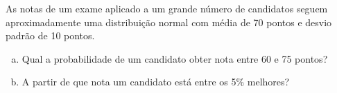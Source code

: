 %
%


\begin{exercicioBanco}[\valorquestao]
As notas de um exame aplicado a um grande número de candidatos seguem aproximadamente uma distribuição normal com média de 70 pontos e desvio padrão de 10 pontos.
%
\begin{enumerate}[(a)]
    \item Qual a probabilidade de um candidato obter nota entre 60 e 75 pontos?
    \item A partir de que nota um candidato está entre os 5\% melhores?
\end{enumerate}
%
\end{exercicioBanco}

